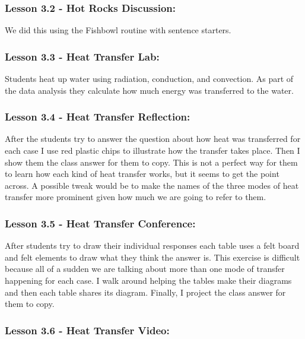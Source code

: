 \documentclass[11pt]{article}
\begin{document}
\subsubsection{Lesson 3.2 - Hot Rocks Discussion:}
\label{sec:orgbd3193b}

We did this using the Fishbowl routine with sentence starters.


\subsubsection{Lesson 3.3 - Heat Transfer Lab:}
\label{sec:org140b82c}

Students heat up water using radiation, conduction, and
convection. As part of the data analysis they calculate how much energy was transferred
to the water.


\subsubsection{Lesson 3.4 - Heat Transfer Reflection:}
\label{sec:orgb26fed9}

After the students try to answer the question about how heat was transferred for each case I use red plastic chips to illustrate how the
transfer takes place. Then I show them the class answer for them to copy. This is not a
perfect way for them to learn how each kind of heat transfer works, but it seems to get
the point across. A possible tweak would be to make the names of the three modes of
heat transfer more prominent given how much we are going to refer to them.


\subsubsection{Lesson 3.5 - Heat Transfer Conference:}
\label{sec:org1d32b5a}

After students try to draw their individual responses each table uses a felt board and felt elements to draw what they think the
answer is. This exercise is difficult because all of a sudden we are talking about more
than one mode of transfer happening for each case. I walk around helping the tables
make their diagrams and then each table shares its diagram. Finally, I project the class
answer for them to copy.


\subsubsection{Lesson 3.6 - Heat Transfer Video:}
\label{sec:org0700386}
\end{document}
